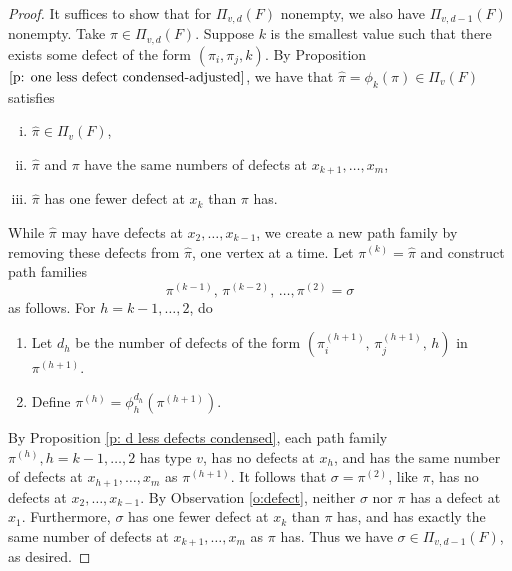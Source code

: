 \documentclass[12pt]{amsart}
\theoremstyle{definition}
\numberwithin{equation}{section}
\newcommand{\ctr}[1]{{x}_{#1}}
\begin{document}




\begin{proof}
    It suffices to show that for $\Pi_{v,d}(F)$ nonempty, we also have $\Pi_{v,d-1}(F)$ nonempty. Take $\pi \in \Pi_{v,d}(F)$. Suppose $k$ is the smallest value such that there exists some defect of the form $(\pi_i, \pi_j, k)$. By Proposition $\ref{p: one less defect condensed-adjusted}$, we have that $\hat\pi = \phi_k(\pi)\in \Pi_{v}(F)$ satisfies
    \begin{enumerate}[(i)]
        \item $\hat\pi \in \Pi_v(F)$,
        \item $\hat\pi$ and $\pi$ have the same numbers of defects at 
        $x_{k+1}, \dotsc, x_m$,
        \item $\hat\pi$ has one fewer defect at $x_k$ than $\pi$ has.
        \end{enumerate}
While $\hat \pi$ may have defects at $x_2,\dotsc,x_{k-1}$,
we create a new path family by removing these defects from $\hat \pi$, one vertex at a time.
Let $\pi^{(k)} = \hat \pi$ and construct path families 
\begin{equation*}
    \pi^{(k-1)},\, \pi^{(k-2)},\, \dots, \pi^{(2)} = \sigma
\end{equation*}
as follows. For $h = k-1, \dots, 2$, do
\begin{enumerate}
    \item Let $d_h$ be the number of defects of the form $(\pi_i^{(h+1)},\, \pi_j^{(h+1)},\, h)$ in $\pi^{(h+1)}$.
    \item Define $\pi^{(h)} = \phi_h^{d_h}(\pi^{(h+1)})$.
\end{enumerate}
By Proposition \ref{p: d less defects condensed}, each path family $\pi^{(h)}, h = k-1, \dots, 2$ has type $v$, has no defects at $\ctr h$, and has the same number of defects at $\ctr{h+1}, \dots, \ctr m$ as $\pi^{(h+1)}$. It follows that $\sigma = \pi^{(2)}$, like $\pi$, has no defects at $\ctr 2, \dots, \ctr{k - 1}$. By Observation \ref{o:defect}, neither $\sigma$ nor $\pi$ has a defect at $\ctr 1$. Furthermore, $\sigma$ has one fewer defect at $\ctr k$ than $\pi$ has, and has exactly the same number of defects at $\ctr{k+1}, \dots, \ctr{m}$ as $\pi$ has. Thus we have $\sigma \in \Pi_{v, d-1}(F)$, as desired.

\end{proof}
\end{document}
